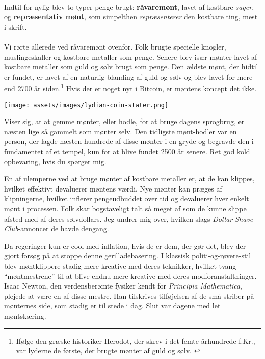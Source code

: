 \paragraph{}
Indtil for nylig blev to typer penge brugt: \textbf{råvaremønt}, lavet
af kostbare \textit{sager}, og \textbf{repræsentativ mønt}, som simpelthen
\textit{repræsenterer} den kostbare ting, mest i skrift.

\paragraph{}
Vi rørte allerede ved råvaremønt ovenfor. Folk brugte specielle knogler,
muslingeskaller og kostbare metaller som penge. Senere blev især mønter lavet af
kostbare metaller som guld og sølv brugt som penge. Den ældste mønt, der hidtil er
fundet, er lavet af en naturlig blanding af guld og sølv og blev lavet for mere end
2700 år siden.\footnote{Ifølge den græske historiker Herodot, der skrev i
det femte århundrede f.Kr., var lyderne de første, der brugte mønter af guld og sølv.
\cite{coinage-origins}} Hvis der er noget nyt i Bitcoin, er møntens koncept det ikke.

\newpage

\begin{center}
  \centering
  \texttt{[image: assets/images/lydian-coin-stater.png]}
  \label{fig:lydian-coin-stater}
\end{center}

Viser sig, at at gemme mønter, eller hodle, for at bruge dagens sprogbrug, er næsten lige så gammelt som mønter selv. Den tidligste mønt-hodler var en person, der lagde næsten hundrede af disse mønter i en gryde og begravde den i fundamentet af et tempel, kun for at blive fundet 2500 år senere. Ret god kold opbevaring, hvis du spørger mig.

En af ulemperne ved at bruge mønter af kostbare metaller er, at de kan klippes, hvilket effektivt devaluerer møntens værdi. Nye mønter kan præges af klipningerne, hvilket inflerer pengeudbuddet over tid og devaluerer hver enkelt mønt i processen. Folk skar bogstaveligt talt så meget af som de kunne slippe afsted med af deres sølvdollars. Jeg undrer mig over, hvilken slags \textit{Dollar Shave Club}-annoncer de havde dengang.

Da regeringer kun er cool med inflation, hvis de er dem, der gør det, blev der gjort forsøg på at stoppe denne gerilladebasering. I klassisk politi-og-røvere-stil blev møntklippere stadig mere kreative med deres teknikker, hvilket tvang \enquote{møntmestrene} til at blive endnu mere kreative med deres modforanstaltninger. Isaac Newton, den verdensberømte fysiker kendt for \textit{Principia Mathematica}, plejede at være en af disse mestre. Han tilskrives tilføjelsen af de små striber på mønternes side, som stadig er til stede i dag. Slut var dagene med let møntskæring.


